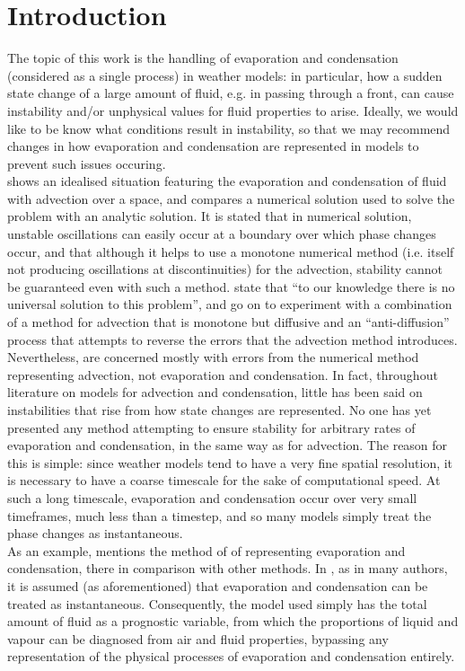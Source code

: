 \documentclass[11pt]{article}
\begin{document}
\section{Introduction}
The topic of this work is the handling of evaporation and condensation (considered as a single process) in weather models: in particular, how a sudden state change of a large amount of fluid, e.g. in passing through a front, can cause instability and/or unphysical values for fluid properties to arise. Ideally, we would like to be know what conditions result in instability, so that we may recommend changes in how evaporation and condensation are represented in models to prevent such issues occuring. \\
\citet{GS1990} shows an idealised situation featuring the evaporation and condensation of fluid with advection over a space, and compares a numerical solution used to solve the problem with an analytic solution. It is stated that in numerical solution, unstable oscillations can easily occur at a boundary over which phase changes occur, and that although it helps to use a monotone numerical method (i.e. itself not producing oscillations at discontinuities) for the advection, stability cannot be guaranteed even with such a method. \citeauthor{GS1990} state that ``to our knowledge there is no universal solution to this problem'', and go on to experiment with a combination of a method for advection that is monotone but diffusive and an ``anti-diffusion'' process that attempts to reverse the errors that the advection method introduces. \\
Nevertheless, \citeauthor{GS1990} are concerned mostly with errors from the numerical method representing advection, not evaporation and condensation. In fact, throughout literature on models for advection and condensation, little has been said on instabilities that rise from how state changes are represented. No one has yet presented any method attempting to ensure stability for arbitrary rates of evaporation and condensation, in the same way as \citeauthor{GS1990} for advection. The reason for this is simple: since weather models tend to have a very fine spatial resolution, it is necessary to have a coarse timescale for the sake of computational speed. At such a long timescale, evaporation and condensation occur over very small timeframes, much less than a timestep, and so many models simply treat the phase changes as instantaneous. \\
As an example, \citet[p.~2095]{Wilson2008} mentions the method of \citet{Smith1990} of representing evaporation and condensation, there in comparison with other methods. In \citeauthor{Smith1990}, as in many authors, it is assumed (as aforementioned) that evaporation and condensation can be treated as instantaneous. Consequently, the model used simply has the total amount of fluid as a prognostic variable, from which the proportions of liquid and vapour can be diagnosed from air and fluid properties, bypassing any representation of the physical processes of evaporation and condensation entirely. \\
\end{document}
